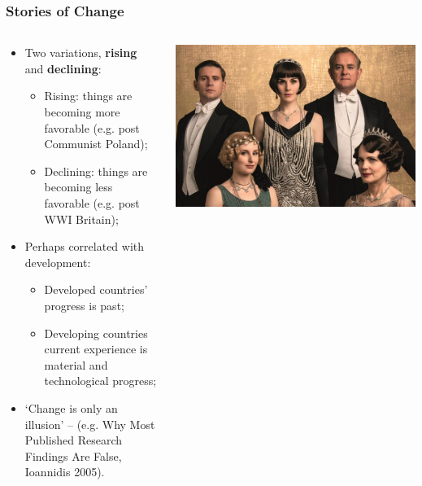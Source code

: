 \documentclass[aspectratio=169]{beamer}
\theoremstyle{principle}
\begin{document}
\begin{frame}
\frametitle{Stories of Change}
\begin{columns}
\begin{column}{0.5\textwidth}

\begin{itemize}
\item Two variations, \textbf{rising} and \textbf{declining}:
\begin{itemize}
\item Rising: things are becoming more favorable (e.g. post Communist Poland);
\item Declining: things are becoming less favorable (e.g. post WWI Britain);
\end{itemize}
\bigskip
\item Perhaps correlated with development:
\begin{itemize}
\item Developed countries' progress is past;
\item Developing countries current experience is material and technological progress;
\end{itemize}
\bigskip
\item `Change is only an illusion' -- (e.g. Why Most Published Research Findings Are False, Ioannidis 2005).
\end{itemize}

\end{column}
\begin{column}{0.5\textwidth}
\includegraphics[scale=0.25]{downton.png}
\end{column}
\end{columns}

\end{frame}
\end{document}
